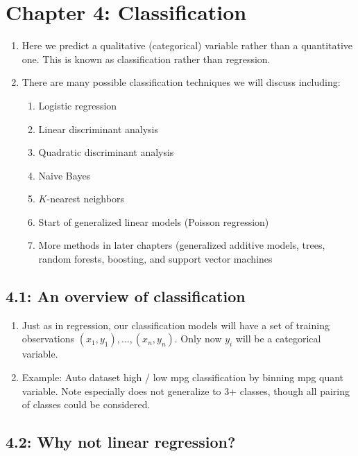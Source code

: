 \documentclass{article}
\begin{document}
\section*{Chapter 4: Classification} 

\begin{enumerate}
\item Here we predict a qualitative (categorical) variable rather than a quantitative one. This is known as classification rather than regression.
\item There are many possible classification techniques we will discuss including:
\begin{enumerate}
\item Logistic regression
\item Linear discriminant analysis
\item Quadratic discriminant analysis
\item Naive Bayes
\item $K$-nearest neighbors
\item Start of generalized linear models (Poisson regression)
\item More methods in later chapters (generalized additive models, trees, random forests, boosting, and support vector machines
\end{enumerate}
\end{enumerate}

\subsection*{4.1: An overview of classification}

\begin{enumerate}
\item Just as in regression, our classification models will have a set of training observations $(x_1, y_1), \dots, (x_n, y_n)$. Only now $y_i$ will be a categorical variable.
\item Example: Auto dataset high / low mpg classification by binning mpg quant variable. Note especially does not generalize to 3+ classes, though all pairing of classes could be considered.
\end{enumerate}

\subsection*{4.2: Why not linear regression?}
\end{document}
